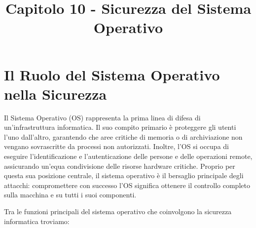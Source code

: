 \documentclass{article}
\title{Capitolo 10 - Sicurezza del Sistema Operativo}
\author{}
\date{}
\begin{document}
\maketitle

\section*{Il Ruolo del Sistema Operativo nella Sicurezza}

Il Sistema Operativo (OS) rappresenta la prima linea di difesa di un'infrastruttura informatica. Il suo compito primario è proteggere gli utenti l'uno dall'altro, garantendo che aree critiche di memoria o di archiviazione non vengano sovrascritte da processi non autorizzati. Inoltre, l'OS si occupa di eseguire l'identificazione e l'autenticazione delle persone e delle operazioni remote, assicurando un'equa condivisione delle risorse hardware critiche. Proprio per questa sua posizione centrale, il sistema operativo è il bersaglio principale degli attacchi: compromettere con successo l'OS significa ottenere il controllo completo sulla macchina e su tutti i suoi componenti.

Tra le funzioni principali del sistema operativo che coinvolgono la sicurezza informatica troviamo:
\end{document}
